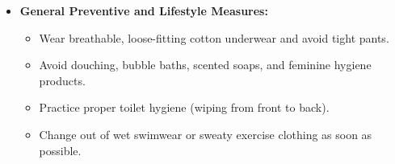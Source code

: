 \begin{itemize}
\begin{itemize}
    \end{itemize}
    \item \textbf{General Preventive and Lifestyle Measures:}
    \begin{itemize}
        \item Wear breathable, loose-fitting cotton underwear and avoid tight pants.
        \item Avoid douching, bubble baths, scented soaps, and feminine hygiene products.
        \item Practice proper toilet hygiene (wiping from front to back).
        \item Change out of wet swimwear or sweaty exercise clothing as soon as possible.
    \end{itemize}
\end{itemize}

